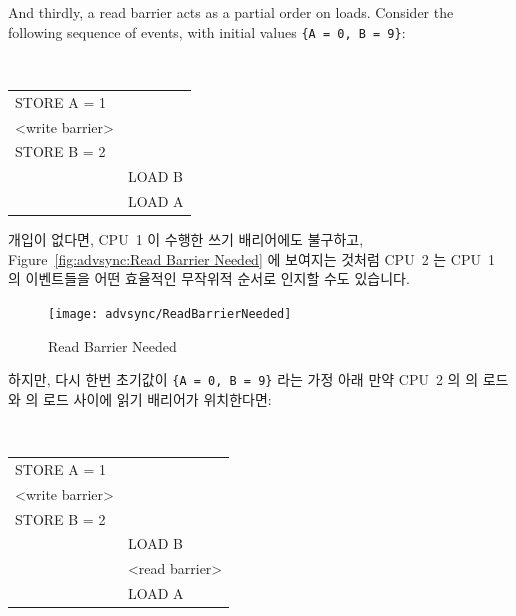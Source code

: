 \begin{enumerate}
And thirdly, a read barrier acts as a partial order on loads.  Consider the
following sequence of events, with initial values
{\tt \{A~=~0, B~=~9\}}:
\fi

\vspace{5pt}
\begin{minipage}[t]{\columnwidth}
\tt
\scriptsize
\begin{tabular}{l|p{1.5in}}
	\nf{CPU 1}	& \nf{CPU 2} \\
	\hline
	STORE A = 1	& \\
	<write barrier>	& \\
	STORE B = 2	& \\
			& LOAD B \\
			& LOAD A \\
\end{tabular}
\end{minipage}
\vspace{5pt}

개입이 없다면, CPU~1 이 수행한 쓰기 배리어에도 불구하고,
Figure~\ref{fig:advsync:Read Barrier Needed} 에 보여지는 것처럼 CPU~2 는 CPU~1
의 이벤트들을 어떤 효율적인 무작위적 순서로 인지할 수도 있습니다.

\begin{figure}[htbp]
\centering
\texttt{[image: advsync/ReadBarrierNeeded]}
\caption{Read Barrier Needed}
\end{figure}

하지만, 다시 한번 초기값이 {\tt \{A = 0, B = 9\}} 라는 가정 아래 만약 CPU~2 의
 의 로드와  의 로드 사이에 읽기 배리어가 위치한다면:

\vspace{5pt}
\begin{minipage}[t]{\columnwidth}
\tt
\scriptsize
\begin{tabular}{l|p{1.5in}}
	\nf{CPU 1}	& \nf{CPU 2} \\
	\hline
	STORE A = 1	& \\
	<write barrier>	& \\
	STORE B = 2	& \\
			& LOAD B \\
			& <read barrier> \\
			& LOAD A \\
\end{tabular}
\end{minipage}
\vspace{5pt}


\end{enumerate}
